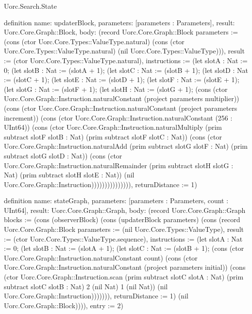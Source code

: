 \begin{lexlean}{Uorc.Search.State}
\begin{semanticmodule}
definition{
  name: updaterBlock,
  parameters: [parameters : Parameters],
  result: Uorc.Core.Graph::Block,
  body: (record Uorc.Core.Graph::Block {parameters := (cons (ctor Uorc.Core.Types::ValueType.natural) (cons (ctor Uorc.Core.Types::ValueType.natural) (nil Uorc.Core.Types::ValueType))), result := (ctor Uorc.Core.Types::ValueType.natural), instructions := (let slotA : Nat := 0; (let slotB : Nat := (slotA + 1); (let slotC : Nat := (slotB + 1); (let slotD : Nat := (slotC + 1); (let slotE : Nat := (slotD + 1); (let slotF : Nat := (slotE + 1); (let slotG : Nat := (slotF + 1); (let slotH : Nat := (slotG + 1); (cons (ctor Uorc.Core.Graph::Instruction.naturalConstant (project parameters multiplier)) (cons (ctor Uorc.Core.Graph::Instruction.naturalConstant (project parameters increment)) (cons (ctor Uorc.Core.Graph::Instruction.naturalConstant (256 : UInt64)) (cons (ctor Uorc.Core.Graph::Instruction.naturalMultiply (prim subtract slotF slotB : Nat) (prim subtract slotF slotC : Nat)) (cons (ctor Uorc.Core.Graph::Instruction.naturalAdd (prim subtract slotG slotF : Nat) (prim subtract slotG slotD : Nat)) (cons (ctor Uorc.Core.Graph::Instruction.naturalRemainder (prim subtract slotH slotG : Nat) (prim subtract slotH slotE : Nat)) (nil Uorc.Core.Graph::Instruction))))))))))))))), returnDistance := 1})
}

definition{
  name: stateGraph,
  parameters: [parameters : Parameters, count : UInt64],
  result: Uorc.Core.Graph::Graph,
  body: (record Uorc.Core.Graph::Graph {blocks := (cons (observerBlock) (cons (updaterBlock parameters) (cons (record Uorc.Core.Graph::Block {parameters := (nil Uorc.Core.Types::ValueType), result := (ctor Uorc.Core.Types::ValueType.sequence), instructions := (let slotA : Nat := 0; (let slotB : Nat := (slotA + 1); (let slotC : Nat := (slotB + 1); (cons (ctor Uorc.Core.Graph::Instruction.naturalConstant count) (cons (ctor Uorc.Core.Graph::Instruction.naturalConstant (project parameters initial)) (cons (ctor Uorc.Core.Graph::Instruction.scan (prim subtract slotC slotA : Nat) (prim subtract slotC slotB : Nat) 2 (nil Nat) 1 (nil Nat)) (nil Uorc.Core.Graph::Instruction))))))), returnDistance := 1}) (nil Uorc.Core.Graph::Block)))), entry := 2})
}


\end{semanticmodule}
\end{lexlean}
